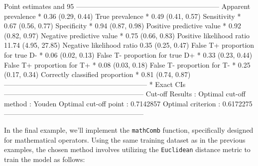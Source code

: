 \documentclass[10pt]{article}
\begin{document}
\begin{Schunk}
\begin{Soutput}
Point estimates and 95% CIs:
--------------------------------------------------------------
Apparent prevalence *                  0.36 (0.29, 0.44)
True prevalence *                      0.49 (0.41, 0.57)
Sensitivity *                          0.67 (0.56, 0.77)
Specificity *                          0.94 (0.87, 0.98)
Positive predictive value *            0.92 (0.82, 0.97)
Negative predictive value *            0.75 (0.66, 0.83)
Positive likelihood ratio              11.74 (4.95, 27.85)
Negative likelihood ratio              0.35 (0.25, 0.47)
False T+ proportion for true D- *      0.06 (0.02, 0.13)
False T- proportion for true D+ *      0.33 (0.23, 0.44)
False T+ proportion for T+ *           0.08 (0.03, 0.18)
False T- proportion for T- *           0.25 (0.17, 0.34)
Correctly classified proportion *      0.81 (0.74, 0.87)
--------------------------------------------------------------
* Exact CIs
------------------------------------------------------------ 
Cut-off Results : 
Optimal cut-off method : Youden 
Optimal cut-off point  : 0.7142857 
Optimal criterion      : 0.6172275 
------------------------------------------------------------ 
\end{Soutput}
\end{Schunk}
In the final example, we'll implement the \texttt{mathComb} function, specifically designed for mathematical operators. Using the same training dataset as in the previous examples, the chosen method involves utilizing the \texttt{Euclidean} distance metric to train the model as follows:
\end{document}
